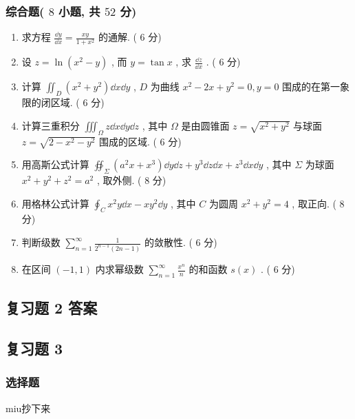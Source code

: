 \subsubsection{综合题( $8$ 小题, 共 $52$ 分)}
\begin{enumerate}
	\item 求方程 $\frac{\dd y}{\dd x}=\frac{x y}{1+x^{2}}$ 的通解. ( $6$ 分)
	
	\item 设 $z=\ln \left(x^{2}-y\right)$ , 而 $y=\tan x$ , 求 $\frac{\dd z}{\dd x}$ . ( $6$ 分)
	
	\item 计算 $\iint_{D}\left(x^{2}+y^{2}\right) \dd x \dd y$ , $D$ 为曲线 $x^{2}-2 x+y^{2}=0, y=0$ 围成的在第一象限的闭区域. ( $6$ 分)
	
	\item 计算三重积分 $\iiint_{\Omega} z \dd x \dd y \dd z$ , 其中 $\Omega$ 是由圆锥面 $z=\sqrt{x^{2}+y^{2}}$ 与球面 $z=\sqrt{2-x^{2}-y^{2}}$ 围成的区域. ( $6$ 分)
	
	\item 用高斯公式计算 $\oiint_{\Sigma}\left(a^{2} x+x^{3}\right) \dd y \dd z+y^{3} \dd z \dd x+z^{3} \dd x \dd y$ , 其中 $\Sigma$ 为球面 $x^{2}+y^{2}+z^{2}=a^{2}$ , 取外侧. ( $8$ 分)
	
	\item 用格林公式计算 $\oint_{C} x^{2} y \dd x-x y^{2} \dd y$ , 其中 $C$ 为圆周 $x^2+y^2=4$ , 取正向. ( $8$ 分)
	
	\item 判断级数 $\sum_{n=1}^{\infty} \frac{1}{2^{n-1}(2 n-1)}$ 的敛散性. ( $6$ 分)
	
	\item 在区间 $(-1,1)$ 内求幂级数 $\sum_{n=1}^{\infty} \frac{x^{n}}{n}$ 的和函数 $s(x)$ . ( $6$ 分)
\end{enumerate}


\subsection{复习题 2 答案}

\subsection{复习题 3}
\subsubsection{选择题}
miu抄下来
